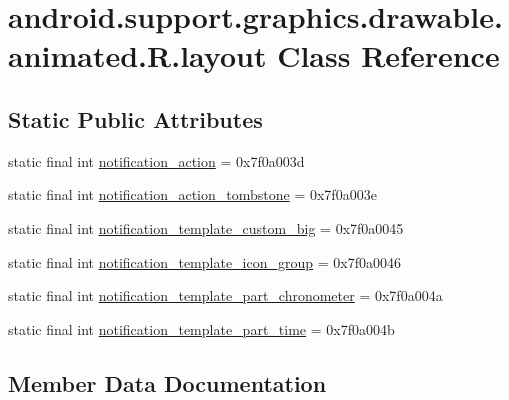 \hypertarget{classandroid_1_1support_1_1graphics_1_1drawable_1_1animated_1_1R_1_1layout}{}\section{android.\+support.\+graphics.\+drawable.\+animated.\+R.\+layout Class Reference}
\label{classandroid_1_1support_1_1graphics_1_1drawable_1_1animated_1_1R_1_1layout}
\subsection*{Static Public Attributes}
\begin{DoxyCompactItemize}
\item 
static final int \mbox{\hyperlink{classandroid_1_1support_1_1graphics_1_1drawable_1_1animated_1_1R_1_1layout_ab6a7ce2bec7c419bd056344980a2bfe4}{notification\+\_\+action}} = 0x7f0a003d
\item 
static final int \mbox{\hyperlink{classandroid_1_1support_1_1graphics_1_1drawable_1_1animated_1_1R_1_1layout_ad267220bf2614e287a423c9daae9d5ba}{notification\+\_\+action\+\_\+tombstone}} = 0x7f0a003e
\item 
static final int \mbox{\hyperlink{classandroid_1_1support_1_1graphics_1_1drawable_1_1animated_1_1R_1_1layout_a91cd88a6160b017d7b1e33d028625488}{notification\+\_\+template\+\_\+custom\+\_\+big}} = 0x7f0a0045
\item 
static final int \mbox{\hyperlink{classandroid_1_1support_1_1graphics_1_1drawable_1_1animated_1_1R_1_1layout_af7a9952feddc7fe876e7cf9cf469b843}{notification\+\_\+template\+\_\+icon\+\_\+group}} = 0x7f0a0046
\item 
static final int \mbox{\hyperlink{classandroid_1_1support_1_1graphics_1_1drawable_1_1animated_1_1R_1_1layout_a11d27386cb41f01081c07de501f821a2}{notification\+\_\+template\+\_\+part\+\_\+chronometer}} = 0x7f0a004a
\item 
static final int \mbox{\hyperlink{classandroid_1_1support_1_1graphics_1_1drawable_1_1animated_1_1R_1_1layout_a58ea2615a1760f93ef687e8c1db58feb}{notification\+\_\+template\+\_\+part\+\_\+time}} = 0x7f0a004b
\end{DoxyCompactItemize}


\subsection{Member Data Documentation}
\mbox{\label{classandroid_1_1support_1_1graphics_1_1drawable_1_1animated_1_1R_1_1layout_ab6a7ce2bec7c419bd056344980a2bfe4}} 
